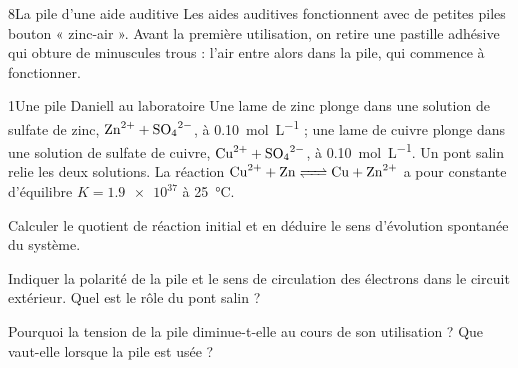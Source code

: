 

\begin{exoBac}{8}{La pile d'une aide auditive}
Les aides auditives fonctionnent avec de petites piles bouton « zinc-air ». Avant la première utilisation, on retire une
pastille adhésive qui obture de minuscules trous : l'air entre alors dans la pile, qui commence à fonctionner.

\begin{docu}{1}{Une pile Daniell au laboratoire}
Une lame de zinc plonge dans une solution de sulfate de zinc, $\ce{Zn^{2+}}+\ce{SO4^{2-}}$, à \qty{0,10}{mol.L^{-1}} ; une lame de cuivre
plonge dans une solution de sulfate de cuivre, $\ce{Cu^{2+}}+\ce{SO4^{2-}}$, à \qty{0,10}{mol.L^{-1}}. Un pont salin relie les deux solutions.
La réaction $\ce{Cu^{2+} + Zn <=> Cu + Zn^{2+}}$ a pour constante d'équilibre $K=\num{1.9e37}$ à \qty{25}{\degreeCelsius}.
\end{docu}
\begin{questions}
\item Calculer le quotient de réaction initial et en déduire le sens d'évolution spontanée du système.
\item Indiquer la polarité de la pile et le sens de circulation des électrons dans le circuit extérieur. Quel est le rôle
du pont salin ?
\item Pourquoi la tension de la pile diminue-t-elle au cours de son utilisation ? Que vaut-elle lorsque la pile est usée ?
\end{questions}


\end{exoBac}
